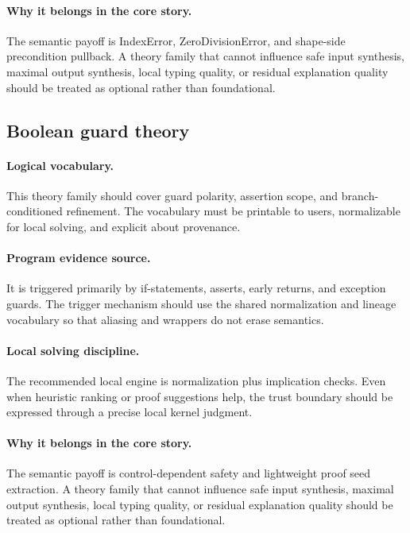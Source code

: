 \documentclass[11pt]{report}
\theoremstyle{definition}
\theoremstyle{plain}
\begin{document}
\paragraph{Why it belongs in the core story.}
The semantic payoff is IndexError, ZeroDivisionError, and shape-side precondition pullback. A theory family that cannot influence safe
input synthesis, maximal output synthesis, local typing quality, or residual
explanation quality should be treated as optional rather than foundational.

\subsection{Boolean guard theory}

\paragraph{Logical vocabulary.}
This theory family should cover guard polarity, assertion scope, and branch-conditioned refinement. The vocabulary must be printable to
users, normalizable for local solving, and explicit about provenance.

\paragraph{Program evidence source.}
It is triggered primarily by if-statements, asserts, early returns, and exception guards. The trigger mechanism should use the
shared normalization and lineage vocabulary so that aliasing and wrappers do
not erase semantics.

\paragraph{Local solving discipline.}
The recommended local engine is normalization plus implication checks. Even when heuristic ranking or
proof suggestions help, the trust boundary should be expressed through a
precise local kernel judgment.

\paragraph{Why it belongs in the core story.}
The semantic payoff is control-dependent safety and lightweight proof seed extraction. A theory family that cannot influence safe
input synthesis, maximal output synthesis, local typing quality, or residual
explanation quality should be treated as optional rather than foundational.
\end{document}

